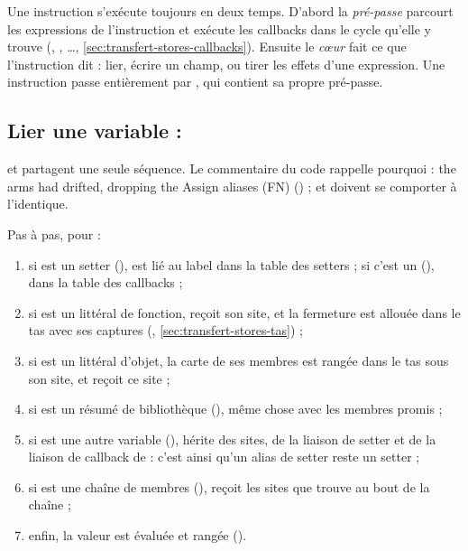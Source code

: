 
Une instruction s'exécute toujours en deux temps. D'abord la
\emph{pré-passe}  parcourt les expressions de
l'instruction et exécute les callbacks \og dans le cycle\fg{} qu'elle y
trouve (, , \ldots,
\cref{sec:transfert-stores-callbacks}). Ensuite le \emph{cœur} fait ce que
l'instruction dit : lier, écrire un champ, ou tirer les effets d'une
expression. Une instruction  passe entièrement par
, qui contient sa propre pré-passe.

\subsection{Lier une variable : }

 et  partagent une seule séquence. Le commentaire du
code rappelle pourquoi : \og the arms had drifted, dropping the Assign
aliases (FN)\fg{} () ;
 et  doivent se comporter à l'identique.



Pas à pas, pour  :
\begin{enumerate}
  \item si  est un setter (),  est
    lié au label  dans la table des setters ; si c'est un
     (), dans la table des callbacks ;
  \item si  est un littéral de fonction,  reçoit son
    site, et la fermeture est allouée dans le tas avec ses captures
    (, \cref{sec:transfert-stores-tas}) ;
  \item si  est un littéral d'objet, la carte de ses membres est
    rangée dans le tas sous son site, et  reçoit ce site ;
  \item si  est un résumé  de bibliothèque
    (), même chose avec les membres promis ;
  \item si  est une autre variable (), 
    hérite des sites, de la liaison de setter et de la liaison de callback de
     : c'est ainsi qu'un alias de setter reste un setter ;
  \item si  est une chaîne de membres (),
     reçoit les sites que  trouve au bout de la
    chaîne ;
  \item enfin, la valeur est évaluée et rangée ().
\end{enumerate}

